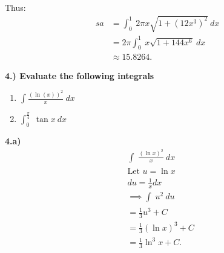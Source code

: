 \documentclass{report}
\begin{document}
    \begin{minipage}[]{0.47\textwidth}
        Thus:
        \begin{align*}
            sa &= \int_{0}^{1}\ 2\pi x\sqrt{1+(12x^{3})^{2}}\ dx \\
            &=2\pi \int_{0}^{1}\ x\sqrt{1+144x^{6}}\ dx \\
            &\approx 15.8264
        .\end{align*}
    
    \end{minipage}

    \pagebreak \bigbreak \noindent 
    \begin{mdframed}
        \textbf{4.) Evaluate the following integrals}
        \bigbreak \noindent 
        \begin{enumerate}[label=(\alph*)]
            \item $\int \frac{(\ln{(x)})^{2}}{x}\ dx $
            \item $\int_{0}^{\frac{\pi}{4}}\ \tan{x}\ dx$
        \end{enumerate}
    \end{mdframed}

    \bigbreak \noindent 
    \textbf{4.a)}
    \bigbreak \noindent 
    \begin{align*}
        &\int_{}^{}\ \frac{(\ln{x})^{2}}{x}\ dx \\
        &\text{Let $u = \ln{x} $} \\
        &du = \frac{1}{x}dx \\
        &\implies \int_{}^{}\ u^{2}\ du \\
        &= \frac{1}{3}u^{3} + C \\
        &= \frac{1}{3}(\ln{x})^{3} + C \\
        &= \frac{1}{3}\ln^{3}{x} + C
    .\end{align*}
\end{document}
